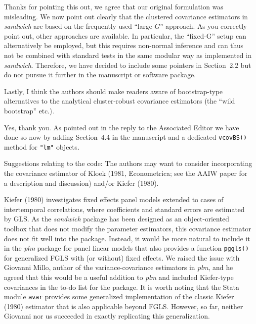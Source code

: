 \documentclass[american,foldmarks=false]{uibklttr}
\let\code=\texttt
\let\pkg=\emph
\newenvironment{review}{\fontshape{\itdefault}\fontseries{\bfdefault} \selectfont \smallskip}{\par}
\begin{document}
Thanks for pointing this out, we agree that our original formulation was
misleading. We now point out clearly that the clustered covariance estimators
in \pkg{sandwich} are based on the frequently-used ``large $G$'' approach. As you
correctly point out, other approaches are available. In particular, the
``fixed-G'' setup can alternatively be employed, but this requires non-normal
inference and can thus not be combined with standard tests in the same modular
way as implemented in \pkg{sandwich}. Therefore, we have decided to include some
pointers in Section~2.2 but do not pursue it further in the manuscript or
software package.


\begin{review}
Lastly, I think the authors should make readers aware of
bootstrap-type alternatives to the analytical cluster-robust covariance
estimators (the ``wild bootstrap'' etc.).
\end{review}

Yes, thank you. As pointed out in the reply to the Associated Editor we have
done so now by adding Section~4.4 in the manuscript and a dedicated
\code{vcovBS()} method for \code{"lm"} objects.


\begin{review}
Suggestions relating to the code:
The authors may want to consider incorporating the covariance estimator of
Kloek (1981, Econometrica; see the AAIW paper for a description and discussion)
and/or Kiefer (1980).
\end{review}

Kiefer (1980) investigates fixed effects panel models extended to cases of
intertemporal correlations, where coefficients and standard errors are estimated
by GLS. As the \pkg{sandwich} package has been designed as an object-oriented
toolbox that does not modify the parameter estimators, this covariance estimator
does not fit well into the package. Instead, it would be more natural to include
it in the \pkg{plm} package for panel linear models that also provides a
function \code{pggls()} for generalized FGLS with (or without) fixed effects. We
raised the issue with Giovanni Millo, author of the variance-covariance
estimators in \pkg{plm}, and he agreed that this would be a useful addition to
\pkg{plm} and included Kiefer-type covariances in the to-do list for the
package. It is worth noting that the Stata module \code{avar} provides some
generalized implementation of the classic Kiefer (1980) estimator that is also
applicable beyond FGLS. However, so far, neither Giovanni nor us succeeded in
exactly replicating this generalization.
\end{document}
